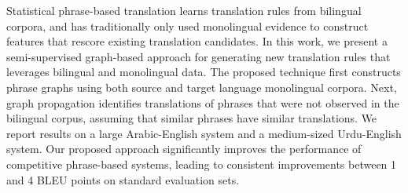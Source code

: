 Statistical phrase-based translation learns translation rules from bilingual corpora, and has traditionally only used monolingual evidence to construct features that rescore existing translation candidates.                          In this work, we present a semi-supervised graph-based approach for generating new translation rules that leverages bilingual and monolingual data.  The proposed technique first constructs phrase graphs using both source and target language monolingual corpora.  Next, graph propagation identifies translations of phrases that were not observed in the bilingual corpus, assuming that similar phrases have similar translations.  We report results on a large Arabic-English system and a medium-sized Urdu-English system.                          Our proposed approach significantly improves the performance of competitive phrase-based systems, leading to consistent improvements between 1 and 4 BLEU points on standard evaluation sets.

